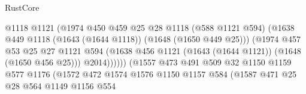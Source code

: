 \begin{lexlean}{RustCore}
\begin{coremodule}
                                            @1118
                                            @1121
                                            (@1974
                                              @450
                                              @459
                                              @25
                                              @28
                                              @1118
                                              (@588 @1121 @594)
                                              (@1638
                                                @449
                                                @1118
                                                (@1643 (@1644 @1118))
                                                (@1648 (@1650 @449 @25)))
                                              (@1974
                                                @457
                                                @53
                                                @25
                                                @27
                                                @1121
                                                @594
                                                (@1638
                                                  @456
                                                  @1121
                                                  (@1643 (@1644 @1121))
                                                  (@1648 (@1650 @456 @25)))
                                                @2014))))))
                                    (@1557
                                      @473
                                      @491
                                      @509
                                      @32
                                      @1150
                                      @1159
                                      @577
                                      @1176
                                      (@1572
                                        @472
                                        @1574
                                        @1576
                                        @1150
                                        @1157
                                        @584
                                        (@1587
                                          @471
                                          @25
                                          @28
                                          @564
                                          @1149
                                          @1156
                                          @554

\end{coremodule}
\end{lexlean}

